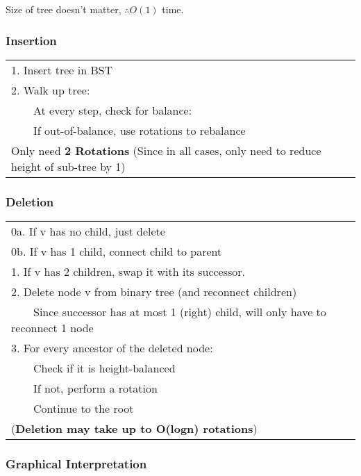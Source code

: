 \documentclass{article}
\newcommand{\tabitem}{~~\llap{\textbullet}~~}
\begin{document}
    Size of tree doesn't matter, $\therefore O(1)$ time.
    
    \subsubsection{Insertion}

    \begin{tabular}{l}
        1. Insert tree in BST \\
        2. Walk up tree:\\
        \tabitem At every step, check for balance:\\
        \tabitem If out-of-balance, use rotations to rebalance\\    
        Only need \textbf{2 Rotations} (Since in all cases, only need to reduce height of sub-tree by 1)\\  
    \end{tabular}
    

    \subsubsection{Deletion}

    \begin{tabular}{l}
        0a. If v has no child, just delete \\
        0b. If v has 1 child, connect child to parent\\
        1. If v has 2 children, swap it with its successor.\\
        2. Delete node v from binary tree (and reconnect children)\\
        \tabitem Since successor has at most 1 (right) child, will only have to reconnect 1 node\\
        3. For every ancestor of the deleted node:\\
        \tabitem Check if it is height-balanced\\
        \tabitem If not, perform a rotation\\
        \tabitem Continue to the root\\
        (\textbf{Deletion may take up to O(logn) rotations})\\        
    \end{tabular}


    \pagebreak
    
    \subsubsection{Graphical Interpretation}
\end{document}
